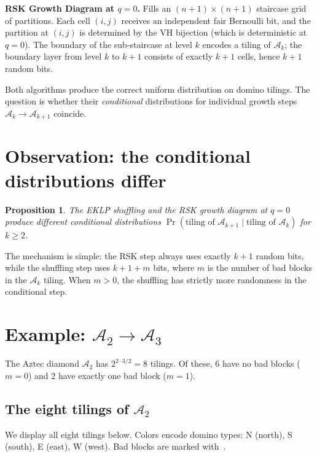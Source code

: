 \documentclass[letterpaper,11pt,oneside]{article}
\newtheorem{proposition}{Proposition}
\newcommand{\AZ}{\mathcal{A}}
\begin{document}
\noindent\textbf{RSK Growth Diagram at $q=0$.}
Fills an $(n{+}1)\times(n{+}1)$ staircase grid of partitions.
Each cell $(i,j)$ receives an independent fair Bernoulli bit, and the
partition at $(i,j)$ is determined by the VH bijection (which is deterministic
at $q=0$). The boundary of the sub-staircase at level $k$ encodes a tiling of
$\AZ_k$; the boundary layer from level $k$ to $k{+}1$ consists of exactly
$k{+}1$ cells, hence $k{+}1$ random bits.

\medskip

Both algorithms produce the correct uniform distribution on domino tilings.
The question is whether their \emph{conditional} distributions for individual
growth steps $\AZ_k \to \AZ_{k+1}$ coincide.

\section{Observation: the conditional distributions differ}

\begin{proposition}\label{prop:different}
  The EKLP shuffling and the RSK growth diagram at $q=0$ produce different
  conditional distributions $\Pr(\text{tiling of } \AZ_{k+1} \mid
  \text{tiling of } \AZ_k)$ for $k \ge 2$.
\end{proposition}

The mechanism is simple: the RSK step always uses exactly $k{+}1$ random
bits, while the shuffling step uses $k{+}1{+}m$ bits, where $m$ is the number
of bad blocks in the $\AZ_k$ tiling. When $m > 0$, the shuffling has strictly
more randomness in the conditional step.

\section{Example: $\AZ_2 \to \AZ_3$}

The Aztec diamond $\AZ_2$ has $2^{2 \cdot 3/2} = 8$ tilings.
Of these, 6 have no bad blocks ($m=0$) and 2 have exactly one bad block
($m=1$).

\subsection{The eight tilings of $\AZ_2$}

We display all eight tilings below.
Colors encode domino types:  N (north),
 S (south),
 E (east),
 W (west).
Bad blocks are marked with \,.
\end{document}
